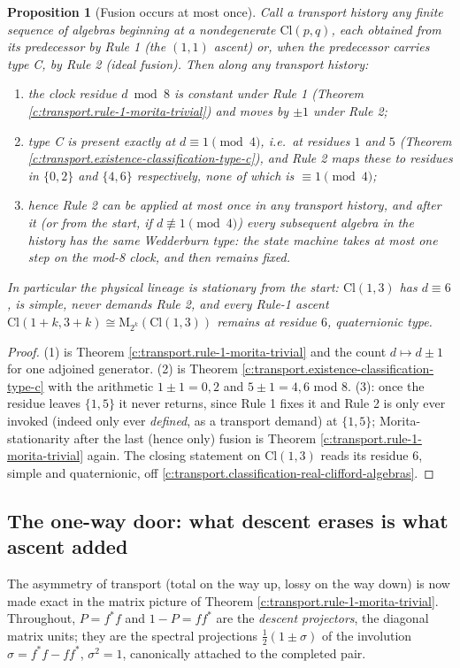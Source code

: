 \documentclass[11pt]{article}
\newtheorem{proposition}[theorem]{Proposition}
\theoremstyle{definition}
\theoremstyle{plain}
\newcommand{\changedmark}[2]{\marginpar{\raggedright\scriptsize\color{#1}#2}}
\providecommand{\Cl}{}\renewcommand{\Cl}{\mathrm{Cl}}
\providecommand{\Mat}{}\renewcommand{\Mat}{\mathrm{M}}
\begin{document}
\begin{proposition}[Fusion occurs at most once]\label{c:transport.fusion-occurs-most-once}
\changedmark{gray}{reworded}
Call a \emph{transport history} any finite sequence of algebras beginning at a nondegenerate $\Cl(p,q)$, each obtained from its predecessor by Rule 1 (the $(1,1)$ ascent) or, when the predecessor carries type C, by Rule 2 (ideal fusion). Then along any transport history:
\begin{enumerate}
\item the clock residue $d \bmod 8$ is constant under Rule 1 (Theorem \ref{c:transport.rule-1-morita-trivial}) and moves by $\pm 1$ under Rule 2;
\item type C is present exactly at $d \equiv 1 \pmod 4$, i.e.\ at residues $1$ and $5$ (Theorem \ref{c:transport.existence-classification-type-c}), and Rule 2 maps these to residues in $\{0, 2\}$ and $\{4, 6\}$ respectively, none of which is $\equiv 1 \pmod 4$;
\item hence Rule 2 can be applied at most once in any transport history, and after it (or from the start, if $d \not\equiv 1 \pmod 4$) every subsequent algebra in the history has the same Wedderburn type: the state machine takes at most one step on the mod-8 clock, and then remains fixed.
\end{enumerate}
In particular the physical lineage is stationary from the start: $\Cl(1,3)$ has $d \equiv 6$, is simple, never demands Rule 2, and every Rule-1 ascent $\Cl(1{+}k, 3{+}k) \cong \Mat_{2^k}(\Cl(1,3))$ remains at residue $6$, quaternionic type.
\end{proposition}
\begin{proof}
(1) is Theorem \ref{c:transport.rule-1-morita-trivial} and the count $d \mapsto d \pm 1$ for one adjoined generator. (2) is Theorem \ref{c:transport.existence-classification-type-c} with the arithmetic $1 \pm 1 = 0, 2$ and $5 \pm 1 = 4, 6$ mod $8$. (3): once the residue leaves $\{1, 5\}$ it never returns, since Rule 1 fixes it and Rule 2 is only ever invoked (indeed only ever \emph{defined}, as a transport demand) at $\{1,5\}$; Morita-stationarity after the last (hence only) fusion is Theorem \ref{c:transport.rule-1-morita-trivial} again. The closing statement on $\Cl(1,3)$ reads its residue $6$, simple and quaternionic, off \ref{c:transport.classification-real-clifford-algebras}.

\end{proof}

\subsection*{The one-way door: what descent erases is what ascent added}
\label{c:note.transport.setting-one-way-door-what-descent}
The asymmetry of transport (total on the way up, lossy on the way down) is now made exact in the matrix picture of Theorem \ref{c:transport.rule-1-morita-trivial}. Throughout, $P = f^*f$ and $1 - P = ff^*$ are the \emph{descent projectors}, the diagonal matrix units; they are the spectral projections $\tfrac12(1 \pm \sigma)$ of the involution $\sigma = f^*f - ff^*$, $\sigma^2 = 1$, canonically attached to the completed pair.
\end{document}
